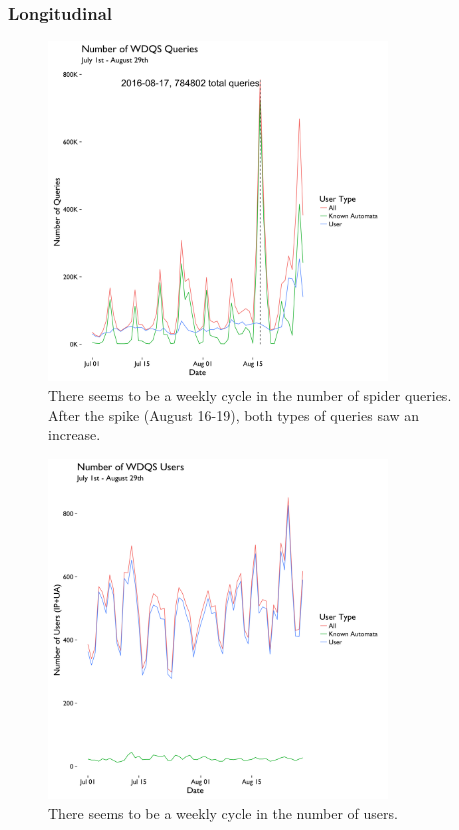 \documentclass[12pt,]{article}
\begin{document}
\subsubsection{Longitudinal}\label{longitudinal}

\begin{figure}[H]
\centering
\includegraphics[width=9cm,height=9cm,keepaspectratio]{figures/all_query_ts.png}
\caption{There seems to be a weekly cycle in the number of spider
queries. After the spike (August 16-19), both types of queries saw an
increase.}
\end{figure}

\begin{figure}[H]
\centering
\includegraphics[width=9cm,height=9cm,keepaspectratio]{figures/all_user_ts.png}
\caption{There seems to be a weekly cycle in the number of users.}
\end{figure}
\end{document}
